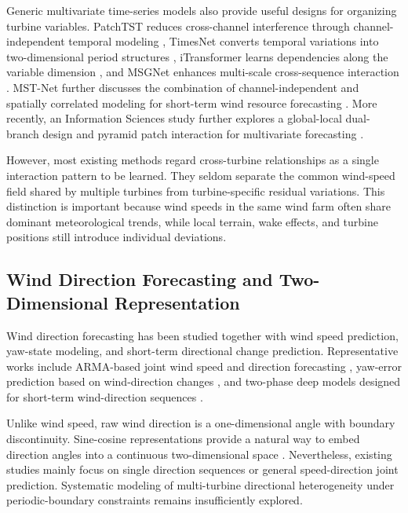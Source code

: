 Generic multivariate time-series models also provide useful designs for organizing turbine variables. PatchTST reduces cross-channel interference through channel-independent temporal modeling \cite{Nie2023PatchTST}, TimesNet converts temporal variations into two-dimensional period structures \cite{Wu2023TimesNetTemporal2DVariationModeling}, iTransformer learns dependencies along the variable dimension \cite{Liu2024iTransformer}, and MSGNet enhances multi-scale cross-sequence interaction \cite{Cai2024MSGNetLearningMultiScaleInterSeriesCorrelations}. MST-Net further discusses the combination of channel-independent and spatially correlated modeling for short-term wind resource forecasting \cite{Lou2026MSTNet}. More recently, an Information Sciences study further explores a global-local dual-branch design and pyramid patch interaction for multivariate forecasting \cite{Zhou2026GLPTGlobalLocalPyramidTransformer}.

However, most existing methods regard cross-turbine relationships as a single interaction pattern to be learned. They seldom separate the common wind-speed field shared by multiple turbines from turbine-specific residual variations. This distinction is important because wind speeds in the same wind farm often share dominant meteorological trends, while local terrain, wake effects, and turbine positions still introduce individual deviations.

\subsection{Wind Direction Forecasting and Two-Dimensional Representation}

Wind direction forecasting has been studied together with wind speed prediction, yaw-state modeling, and short-term directional change prediction. Representative works include ARMA-based joint wind speed and direction forecasting \cite{Erdem2011ARMATupleWindSpeedDirection}, yaw-error prediction based on wind-direction changes \cite{Ouyang2017PredictiveYawError}, and two-phase deep models designed for short-term wind-direction sequences \cite{Tang2021TwoPhaseWindDirection}.

Unlike wind speed, raw wind direction is a one-dimensional angle with boundary discontinuity. Sine-cosine representations provide a natural way to embed direction angles into a continuous two-dimensional space \cite{Erdem2011ARMATupleWindSpeedDirection,Ouyang2017PredictiveYawError}. Nevertheless, existing studies mainly focus on single direction sequences or general speed-direction joint prediction. Systematic modeling of multi-turbine directional heterogeneity under periodic-boundary constraints remains insufficiently explored.
